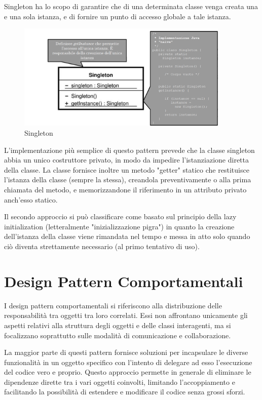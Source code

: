 Singleton ha lo scopo di garantire che di una determinata classe venga creata una e una sola istanza, e di fornire un punto di accesso globale a tale istanza.

\begin{figure}[H]
\includegraphics[width=0.9\textwidth]{res/img/DP/singleton}
\caption{Singleton}
\end{figure}

L'implementazione più semplice di questo pattern prevede che la classe singleton abbia un unico costruttore privato, in modo da impedire l'istanziazione diretta della classe. 
La classe fornisce inoltre un metodo "getter" statico che restituisce l'istanza della classe (sempre la stessa), creandola preventivamente o alla prima chiamata del metodo, e memorizzandone il riferimento in un attributo privato anch'esso statico. 

Il secondo approccio si può classificare come basato sul principio della lazy initialization (letteralmente "inizializzazione pigra") in quanto la creazione dell'istanza della classe viene rimandata nel tempo e messa in atto solo quando ciò diventa strettamente necessario (al primo tentativo di uso).

\section{Design Pattern Comportamentali}
I design pattern comportamentali si riferiscono alla distribuzione delle responsabilità tra oggetti tra loro correlati. 
Essi non affrontano unicamente gli aspetti relativi alla struttura degli oggetti e delle classi interagenti, ma si focalizzano soprattutto sulle modalità di comunicazione e collaborazione.

La maggior parte di questi pattern fornisce soluzioni per incapsulare le diverse funzionalità in un oggetto specifico con l'intento di delegare ad esso l'esecuzione del codice vero e proprio. 
Questo approccio permette in generale di eliminare le dipendenze dirette tra i vari oggetti coinvolti, limitando l'accoppiamento e facilitando la possibilità di estendere e modificare il codice senza grossi sforzi.

